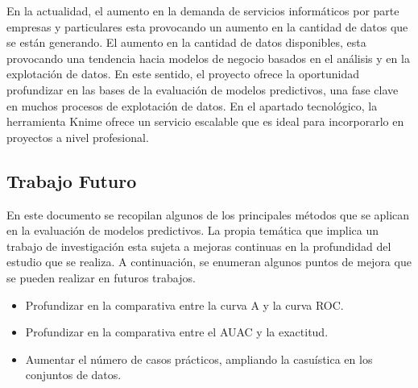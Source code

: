 \bigbreak

En la actualidad, el aumento en la demanda de servicios informáticos por parte empresas y particulares esta provocando un aumento en la cantidad de datos que se están generando. El aumento en la cantidad de datos disponibles, esta provocando una tendencia hacia modelos de negocio basados en el análisis y en la explotación de datos. En este sentido, el proyecto ofrece la oportunidad profundizar en las bases de la evaluación de modelos predictivos, una fase clave en muchos procesos de explotación de datos. En el apartado tecnológico, la herramienta Knime ofrece un servicio escalable que es ideal para incorporarlo en proyectos a nivel profesional.

\subsection{Trabajo Futuro}

En este documento se recopilan algunos de los principales métodos que se aplican en la evaluación de modelos predictivos. La propia temática que implica un trabajo de investigación esta sujeta a mejoras continuas en la profundidad del estudio que se realiza. A continuación, se enumeran algunos puntos de mejora que se pueden realizar en futuros trabajos.

\begin{itemize}
    \item Profundizar en la comparativa entre la curva A y la curva ROC.
    \item Profundizar en la comparativa entre el AUAC y la exactitud.
    \item Aumentar el número de casos prácticos, ampliando la casuística en los conjuntos de datos.
\end{itemize}

\clearpage